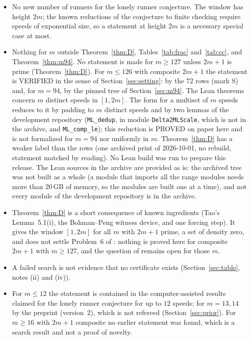 \documentclass[11pt]{article}
\theoremstyle{remark}
\begin{document}
\begin{itemize}
\item No new number of runners for the lonely runner conjecture. The window has height $2m$; the known reductions of the conjecture to finite checking require speeds of exponential size, so a statement at height $2m$ is a necessary special case at most.
\item Nothing for $m$ outside Theorem~\ref{thm:D}, Tables~\ref{tab:frac} and~\ref{tab:cc}, and Theorem~\ref{thm:m94}. No statement is made for $m\ge127$ unless $2m+1$ is prime (Theorem~\ref{thm:D}). For $m\le126$ with composite $2m+1$ the statement is VERIFIED in the sense of Section~\ref{sec:setting}: by the $72$ rows (mark S) and, for $m=94$, by the pinned tree of Section~\ref{sec:m94}. The Lean theorems concern $m$ distinct speeds in $[1,2m]$. The form for a multiset of $m$ speeds reduces to it by padding to $m$ distinct speeds and by two lemmas of the development repository (\texttt{ML\_dedup}, in module \texttt{Delta2MLScale}, which is not in the archive, and \texttt{ML\_comp\_le}); this reduction is PROVED on paper here and is not formalized for $m=94$ nor uniformly in $m$. Theorem~\ref{thm:D} has a weaker label than the rows (one archived print of 2026-10-01, no rebuild, statement matched by reading). No Lean build was run to prepare this release. The Lean sources in the archive are provided as is: the archived tree was not built as a whole (a module that imports all the range modules needs more than 20\,GB of memory, so the modules are built one at a time), and not every module of the development repository is in the archive.
\item Theorem~\ref{thm:D} is a short consequence of known ingredients (Tao's Lemma~5.1(i), the Bohman--Peng witness device, and one forcing step). It gives the window $[1,2m]$ for all $m$ with $2m+1$ prime, a set of density zero, and does not settle Problem~6 of \cite{PS25}: nothing is proved here for composite $2m+1$ with $m\ge127$, and the question of \cite{Tao17} remains open for those $m$.
\item A failed search is not evidence that no certificate exists (Section~\ref{sec:table}, notes (ii) and (iv)).
\item For $m\le12$ the statement is contained in the computer-assisted results claimed for the lonely runner conjecture for up to $12$ speeds; for $m=13,14$ by the preprint \cite{All26} (version~2), which is not refereed (Section~\ref{sec:prior}). For $m\ge16$ with $2m+1$ composite no earlier statement was found, which is a search result and not a proof of novelty.
\end{itemize}
\end{document}
